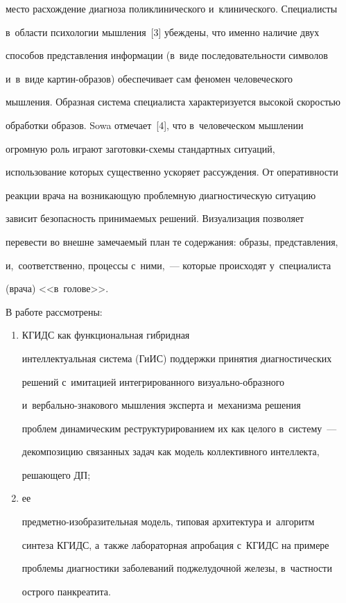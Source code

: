 мес\-то рас\-хож\-де\-ние диагноза поликлинического и~клинического. Специалисты 

в~об\-ласти психологии мыш\-ле\-ния~[3] убеждены, что именно наличие двух 

способов пред\-став\-ле\-ния информации (в~виде по\-сле\-до\-ва\-тель\-ности символов 

и~в~виде кар\-тин-об\-ра\-зов) обеспечивает сам феномен человеческого 

мыш\-ле\-ния. Образная система специалиста характеризуется высокой ско\-ростью 

обработки образов. Sowa отмечает~[4], что в~человеческом мыш\-ле\-нии 

огромную роль играют за\-го\-тов\-ки-схе\-мы стандартных ситуаций, 

использование которых существенно ускоряет рассуждения. От оперативности 

реакции врача на возникающую проб\-лем\-ную диагностическую ситуацию 

зависит безопас\-ность принимаемых решений. Визуализация позволяет 

перевести во внеш\-не за\-ме\-ча\-емый план те содержания: образы, пред\-став\-ле\-ния, 

и,~соответственно, процессы с~ними,~--- которые происходят у~специалиста 

(врача) <<в~голове>>. 

  

  В работе рассмотрены:

  \begin{enumerate}[(1)]

  \item КГИДС как функциональная гибридная 

интеллектуальная сис\-те\-ма (ГиИС) поддержки принятия диагностических 

решений с~имитацией интегрированного ви\-зу\-аль\-но-об\-раз\-но\-го  

и~вер\-баль\-но-зна\-ко\-во\-го мыш\-ле\-ния эксперта и~механизма решения  

проб\-лем динамическим реструктурированием их как целого в~сис\-те\-му~--- 

декомпозицию связанных задач как модель коллективного интеллекта, 

ре\-ша\-юще\-го ДП; 

\item ее  

пред\-мет\-но-изоб\-ра\-зи\-тель\-ная модель, типовая архитектура и~алгоритм 

синтеза \mbox{КГИДС}, а~также лабораторная апробация с~\mbox{КГИДС} на примере 

проблемы диагностики заболеваний поджелудочной железы, в~част\-ности 

острого панкреатита.

\end{enumerate}



